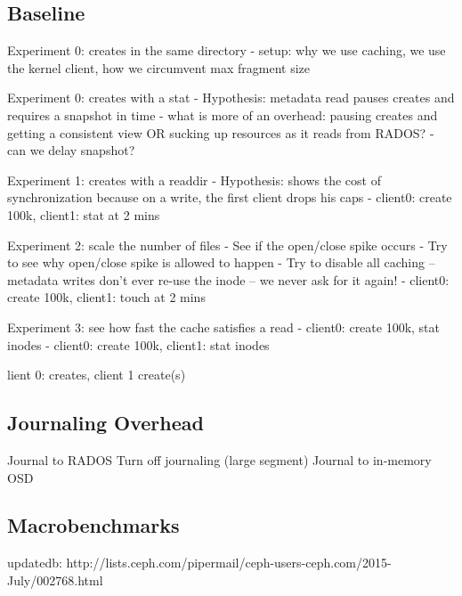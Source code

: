 \documentclass[preprint]{sigplanconf-eurosys}
\begin{document}
\subsection{Baseline}
Experiment 0: creates in the same directory
- setup: why we use caching, we use the kernel client, how we circumvent max fragment size

Experiment 0: creates with a stat
- Hypothesis: metadata read pauses creates and requires a snapshot in time
  - what is more of an overhead: pausing creates and getting a consistent view OR sucking up resources as it reads from RADOS?
- can we delay snapshot?

Experiment 1: creates with a readdir
- Hypothesis: shows the cost of synchronization because on a write, the first client drops his caps
- client0: create 100k, client1: stat at 2 mins

Experiment 2: scale the number of files
- See if the open/close spike occurs 
- Try to see why open/close spike is allowed to happen
- Try to disable all caching -- metadata writes don't ever re-use the inode -- we never ask for it again!
- client0: create 100k, client1: touch at 2 mins

Experiment 3: see how fast the cache satisfies a read
- client0: create 100k, stat inodes
- client0: create 100k, client1: stat inodes

lient 0: creates, client 1 create(s)

\subsection{Journaling Overhead}

Journal to RADOS
Turn off journaling (large segment)
Journal to in-memory OSD 

\subsection{Macrobenchmarks}
updatedb: http://lists.ceph.com/pipermail/ceph-users-ceph.com/2015-July/002768.html



\end{document}
